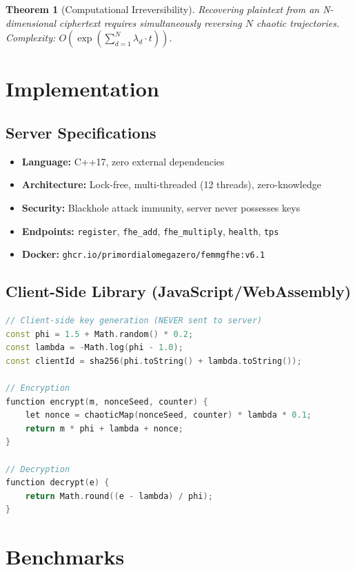 \documentclass{article}
\newtheorem{theorem}{Theorem}[section]
\begin{document}
\begin{theorem}[Computational Irreversibility]
Recovering plaintext from an N-dimensional ciphertext requires simultaneously reversing $N$ chaotic trajectories. Complexity: $O(\exp(\sum_{d=1}^{N} \lambda_d \cdot t))$.
\end{theorem}

\section{Implementation}

\subsection{Server Specifications}

\begin{itemize}
    \item \textbf{Language:} C++17, zero external dependencies
    \item \textbf{Architecture:} Lock-free, multi-threaded (12 threads), zero-knowledge
    \item \textbf{Security:} Blackhole attack immunity, server never possesses keys
    \item \textbf{Endpoints:} \texttt{register}, \texttt{fhe\_add}, \texttt{fhe\_multiply}, \texttt{health}, \texttt{tps}
    \item \textbf{Docker:} \texttt{ghcr.io/primordialomegazero/femmgfhe:v6.1}
\end{itemize}

\subsection{Client-Side Library (JavaScript/WebAssembly)}

\begin{lstlisting}[language=C++, basicstyle=\ttfamily\small]
// Client-side key generation (NEVER sent to server)
const phi = 1.5 + Math.random() * 0.2;
const lambda = -Math.log(phi - 1.0);
const clientId = sha256(phi.toString() + lambda.toString());

// Encryption
function encrypt(m, nonceSeed, counter) {
    let nonce = chaoticMap(nonceSeed, counter) * lambda * 0.1;
    return m * phi + lambda + nonce;
}

// Decryption
function decrypt(e) {
    return Math.round((e - lambda) / phi);
}
\end{lstlisting}

\section{Benchmarks}
\end{document}
